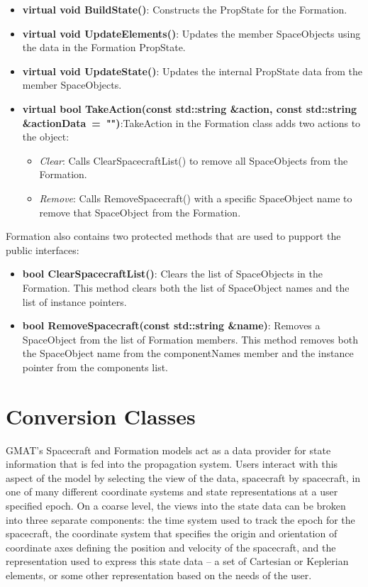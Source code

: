 \begin{itemize}
\item \textbf{virtual void BuildState()}: Constructs the PropState for the Formation.
\item \textbf{virtual void UpdateElements()}: Updates the member SpaceObjects using the data in the
Formation PropState.
\item \textbf{virtual void UpdateState()}: Updates the internal PropState data from the member
SpaceObjects.
\item \textbf{virtual bool TakeAction(const std::string \&action, const std::string
\&actionData~=~"")}:TakeAction in the Formation class adds two actions to the object:
\begin{itemize}
\item \textit{Clear}: Calls ClearSpacecraftList() to remove all SpaceObjects from the Formation.
\item \textit{Remove}: Calls RemoveSpacecraft() with a specific SpaceObject name to remove that
SpaceObject from the Formation.
\end{itemize}
\end{itemize}

\noindent Formation also contains two protected methods that are used to pupport the public
interfaces:

\begin{itemize}
\item \textbf{bool ClearSpacecraftList()}: Clears the list of SpaceObjects in the Formation.  This
method clears both the list of SpaceObject names and the list of instance pointers.
\item \textbf{bool RemoveSpacecraft(const std::string \&name)}: Removes a SpaceObject from the list
of Formation members.  This method removes both the SpaceObject name from the componentNames
member and the instance pointer from the components list.
\end{itemize}

\section{\label{section:ConversionClasses}Conversion Classes}

GMAT's Spacecraft and Formation models act as a data provider for state information that is fed
into the propagation system.  Users interact with this aspect of the model by selecting the view of
the data, spacecraft by spacecraft, in one of many different coordinate systems and state
representations at a user specified epoch.  On a coarse level, the views into the state data can be
broken into three separate components: the time system used to track the epoch for the spacecraft,
the coordinate system that specifies the origin and orientation of coordinate axes defining the
position and velocity of the spacecraft, and the representation used to express this state data --
a set of Cartesian or Keplerian elements, or some other representation based on the needs of the
user.

